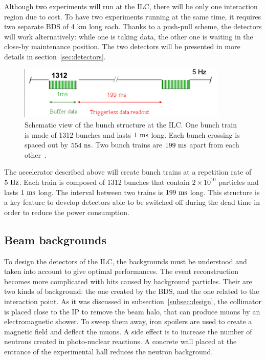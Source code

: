     Although two experiments will run at the \gls{ILC}, there will be only one interaction region due to cost.
    To have two experiments running at the same time, it requires two separate \gls{BDS} of 4 km long each.
    Thanks to a push-pull scheme, the detectors will work alternatively: while one is taking data, the other one is waiting in the close-by maintenance position.
    The two detectors will be presented in more details in section~\ref{sec:detectors}.
    
    \begin{figure}[!h]
      \centering
      \includegraphics[width = 10cm]{Pictures/ILC/bunchTrainILC.png}
      \caption{Schematic view of the bunch structure at the ILC. One bunch train is made of 1312 bunches and lasts $1~\rm{ms}$ long. Each bunch crossing is spaced out by $554~\rm{ns}$. Two bunch trains are $199~\rm{ms}$ apart from each other~\cite{Li2010}.}
      \label{fig:bunches}
    \end{figure}

    The accelerator described above will create bunch trains at a repetition rate of $5~\rm{Hz}$. 
    Each train is composed of 1312 bunches that contain $2\times 10^{10}$ particles and lasts $1~\rm{ms}$ long. 
    The interval between two trains is $199~\rm{ms}$ long. 
    This structure is a key feature to develop detectors able to be switched off during the dead time in order to reduce the power consumption.

    \subsection{Beam backgrounds}

    To design the detectors of the \gls{ILC}, the backgrounds must be understood and taken into account to give optimal performances.
    The event reconstruction becomes more complicated with hits caused by background particles.
    Their are two kinds of background: the one created by the \gls{BDS}, and the one related to the interaction point.
    As it was discussed in subsection~\ref{subsec:design}, the collimator is placed close to the \gls{IP} to remove the beam halo, that can produce muons by an electromagnetic shower.
    To sweep them away, iron spoilers are used to create a magnetic field and deflect the muons.
    A side effect is to increase the number of neutrons created in photo-nuclear reactions.
    A concrete wall placed at the entrance of the experimental hall reduces the neutron background.

